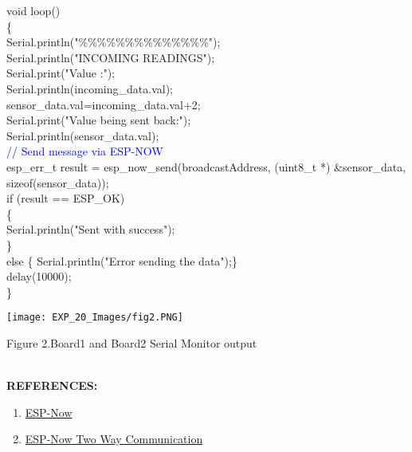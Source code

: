 \documentclass[12pt,a4paper]{article}
\begin{document}
void loop() \\
\{\\  
Serial.println("\%\%\%\%\%\%\%\%\%\%\%\%\%\%");\\
Serial.println("INCOMING READINGS");\\
  Serial.print("Value :");\\
  Serial.println(incoming\_data.val);\\
  sensor\_data.val=incoming\_data.val+2;\\
  Serial.print("Value being sent back:");\\
  Serial.println(sensor\_data.val);\\
 \textcolor{blue}{ // Send message via ESP-NOW}\\
  esp\_err\_t result = esp\_now\_send(broadcastAddress, (uint8\_t *) \&sensor\_data, sizeof(sensor\_data));\\
   
  if (result == ESP\_OK) \\
  \{\\
    Serial.println("Sent with success");\\
  \}\\
  else \{ Serial.println("Error sending the data");\}\\
  delay(10000);\\
\}











\setlength{\parindent}{0pt}
\begin{justify}
\begin{center} 
\texttt{[image: EXP\_20\_Images/fig2.PNG]}
\end{center}
\begin{center} {Figure 2.Board1 and Board2 Serial Monitor output}\end{center}\\

\textbf{\large REFERENCES:}
\vspace{-6mm}
\begin{enumerate}
\setlength\itemsep{-0.3em}
\item  \href {https://docs.espressif.com/projects/esp-idf/en/latest/esp32/api-reference/network/esp_now.html}{ESP-Now}
\item  \href {https://randomnerdtutorials.com/esp-now-two-way-communication-esp32/ }{ESP-Now Two Way Communication}
\end{enumerate}
\end{justify}
\end{document}
